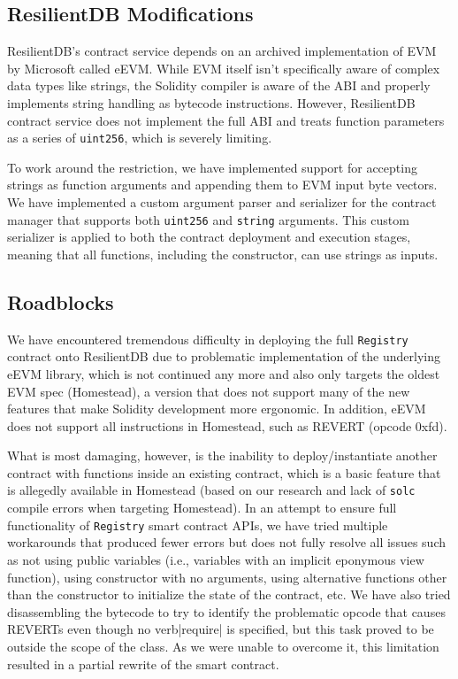 \subsection{ResilientDB Modifications}

ResilientDB’s contract service depends on an archived implementation of EVM by Microsoft called
eEVM. While EVM itself isn’t specifically aware of complex data types like strings, the Solidity
compiler is aware of the ABI and properly implements string handling as bytecode instructions.
However, ResilientDB contract service does not implement the full ABI and treats function parameters
as a series of \verb|uint256|, which is severely limiting.

To work around the restriction, we have implemented support for accepting strings as function
arguments and appending them to EVM input byte vectors. We have implemented a custom argument parser
and serializer for the contract manager that supports both \verb|uint256| and \verb|string| arguments. This custom serializer is applied to both the contract deployment and execution stages, meaning that all functions, including the constructor, can use strings as inputs.

\subsection{Roadblocks} \label{ssec:Roadblocks}

We have encountered tremendous difficulty in deploying the full \verb|Registry| contract onto ResilientDB due to problematic implementation of the underlying eEVM library, which is not continued any more and also only targets the oldest EVM spec (Homestead), a version that does not support many of the new features that make Solidity development more ergonomic. In addition, eEVM does not support all instructions in Homestead, such as REVERT (opcode 0xfd).

What is most damaging, however, is the inability to deploy/instantiate another contract with functions inside an existing contract, which is a basic feature that is allegedly available in Homestead (based on our research and lack of \verb|solc| compile errors when targeting Homestead). In an attempt to ensure full functionality of \verb|Registry| smart contract APIs, we have tried multiple workarounds that produced fewer errors but does not fully resolve all issues such as not using public variables (i.e., variables with an implicit eponymous view function), using constructor with no arguments, using alternative functions other than the constructor to initialize the state of the contract, etc. We have also tried disassembling the bytecode to try to identify the problematic opcode that causes REVERTs even though no verb|require| is specified, but this task proved to be outside the scope of the class. As we were unable to overcome it, this limitation resulted in a partial rewrite of the smart contract.

